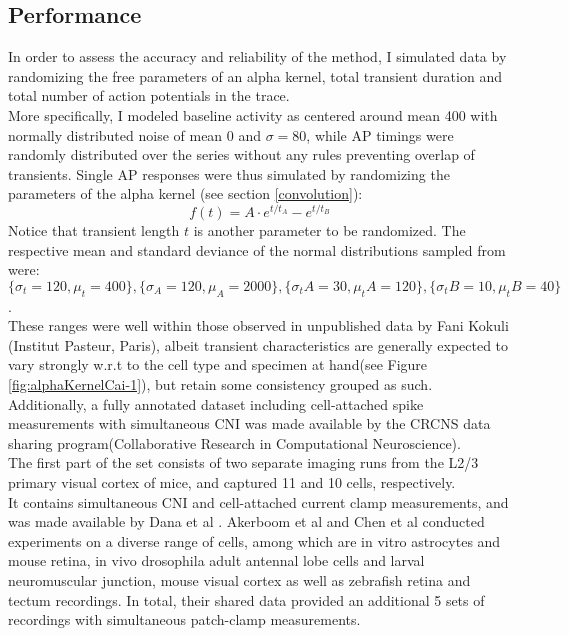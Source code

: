 \documentclass[titlepage]{article}
\begin{document}
\subsection{Performance}
In order to assess the accuracy and reliability of the method, I simulated data by randomizing the free parameters of an alpha kernel, total transient duration and total number of action potentials in the trace.\\
More specifically, I modeled baseline activity as centered around mean 400 with normally distributed noise of mean 0 and $\sigma = 80$, while AP timings were randomly distributed over the series without any rules preventing overlap of transients. Single AP responses were thus simulated by randomizing the parameters of the alpha kernel (see section \ref{convolution}): $$f(t) = A \cdot e^{t/t_A} -  e^{t/t_B} $$
Notice that transient length $t$ is another parameter to be randomized. The respective mean and standard deviance of the normal distributions sampled from were: $\{\sigma_t = 120, \mu_t = 400\},\{\sigma_A = 120, \mu_A = 2000\},\{\sigma_tA = 30, \mu_tA = 120\}, \{\sigma_tB = 10, \mu_tB = 40\}$.\\
These ranges were well within those observed in unpublished data by Fani Kokuli (Institut Pasteur, Paris), albeit transient characteristics are generally expected to vary strongly w.r.t to the cell type and specimen at hand\cite{mukamel_automated_2009}(see Figure \ref{fig:alphaKernelCai-1}), but retain some consistency grouped as such.\\
Additionally, a fully annotated dataset including cell-attached spike measurements with simultaneous CNI was made available by the CRCNS data sharing program(Collaborative Research in Computational Neuroscience)\cite{noauthor_welcome_nodate}\cite{teeters_data_2008}.\\
The first part of the set consists of two separate imaging runs from the L2/3 primary visual cortex of mice, and captured 11 and 10 cells, respectively.\\ 
It contains simultaneous CNI and cell-attached current clamp measurements, and was made available by Dana et al . Akerboom et al\cite{akerboom_optimization_2012} and Chen et al\cite{chen_ultrasensitive_2013} conducted  experiments on a diverse range of cells, among which are in vitro astrocytes and mouse retina, in vivo drosophila adult antennal lobe cells and larval neuromuscular junction, mouse visual cortex as well as zebrafish retina and tectum recordings. In total, their shared data provided an additional 5 sets of recordings with simultaneous patch-clamp measurements.\\\\
\end{document}
